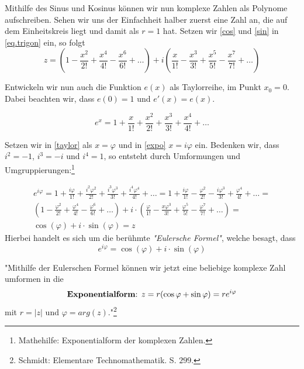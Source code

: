 \documentclass[a4paper,12pt]{article} %
\begin{document}
Mithilfe des Sinus und Kosinus können wir nun komplexe Zahlen als Polynome aufschreiben. Sehen wir uns der Einfachheit halber zuerst eine Zahl an, die auf dem Einheitskreis liegt und damit als $r=1$ hat. Setzen wir \eqref{cos} und \eqref{sin} in \eqref{eq.trigon} ein, so folgt
\begin{equation}\label{taylor}
	z=%
	\left(1-\frac{x^2}{2!}+\frac{x^4}{4!}-\frac{x^6}{6!}+\dots\right)+i\left(\frac{x}{1!}-\frac{x^3}{3!}+\frac{x^5}{5!}-\frac{x^7}{7!}+\dots\right)
\end{equation}

Entwickeln wir nun auch die Funktion $e(x)$ als Taylorreihe, im Punkt $x_0=0$.
Dabei beachten wir, dass $e(0)=1$ und $e\prime(x)=e(x)$.

\begin{equation}\label{expo}
	e^x=1+\frac{x}{1!}+\frac{x^2}{2!}+\frac{x^3}{3!}+\frac{x^4}{4!}+\dots
\end{equation}




Setzen wir in \eqref{taylor} als $x=\varphi$ und in \eqref{expo} $x=i\varphi$ ein.
Bedenken wir, dass $i^2=-1$, $i^3=-i$ und $i^4=1$, so entsteht durch Umformungen und Umgruppierungen:\footnote{Mathehilfe: Exponentialform der komplexen Zahlen.}

\begin{multline}
	e^{i\varphi}=1+\frac{i\varphi}{1!}+\frac{i^2\varphi^2}{2!}+\frac{i^3\varphi^3}{3!}+\frac{i^4\varphi^4}{4!}+\dots=
	1+\frac{i\varphi}{1!}-\frac{\varphi^2}{2!}-\frac{i\varphi^3}{3!}+\frac{\varphi^4}{4!}+\dots=\\
	\left(1-\frac{\varphi^2}{2!}+\frac{\varphi^4}{4!}-\frac{\varphi^6}{6!}+\dots\right)+i\cdot\left(\frac{\varphi}{1!}-\frac{x\varphi^3}{3!}+\frac{\varphi^5}{5!}-\frac{\varphi^7}{7!}+\dots\right) =\\
	\cos(\varphi) + i\cdot \sin(\varphi)=z
\end{multline}
Hierbei handelt es sich um die berühmte \emph{"{}Eulersche Formel"}, welche besagt, dass
\begin{equation} \label{euler}
	e^{i\varphi}=\cos(\varphi)+i\cdot \sin(\varphi)
\end{equation}

"Mithilfe der Eulerschen Formel können wir jetzt eine beliebige komplexe Zahl umformen in die
\begin{equation}
	\textrm{\textbf{Exponentialform}:  } z=r(\cos \varphi + \sin \varphi)= r e^{i\varphi}
\end{equation}
mit $r=|z|$ und $\varphi=arg(z)$."\footnote{{Schmidt: Elementare Technomathematik. S. $299$.}}\\
\end{document}
